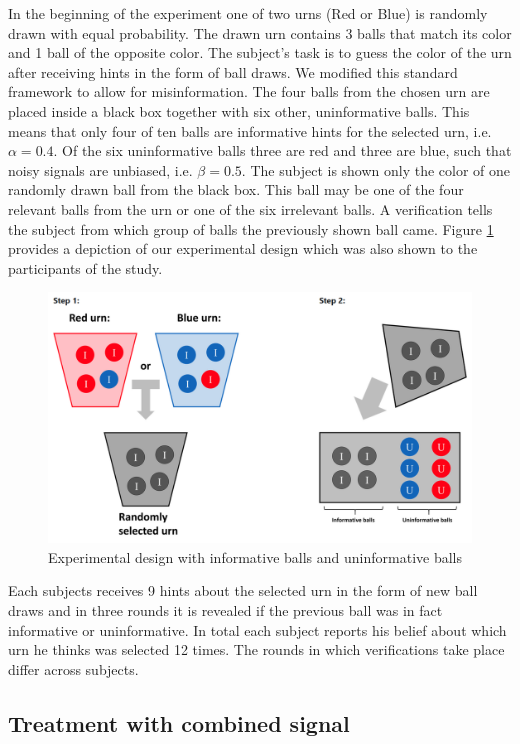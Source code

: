 \documentclass{article}
\begin{document}
In the beginning of the experiment one of two urns (Red or Blue) is randomly drawn with equal probability. The drawn urn contains 3 balls that match its color and 1 ball of the opposite color. The subject's task is to guess the color of the urn after receiving hints in the form of ball draws. We  modified this standard framework to allow for misinformation. The four balls from the chosen urn are placed inside a black box together with six other, uninformative balls. This means that only four of ten balls are informative hints for the selected urn, i.e. $\alpha=0.4$. Of the six uninformative balls three are red and three are blue, such that noisy signals are unbiased, i.e. $\beta=0.5$. The subject is shown only the color of one randomly drawn ball from the black box. This ball may be one of the four relevant balls from the urn or one of the six irrelevant balls. A verification tells the subject from which group of balls the previously shown ball came. Figure \ref{fig:instructions} provides a depiction of our experimental design which was also shown to the participants of the study.

\begin{figure}[!htb]
    \centering
    \includegraphics[width = 12cm]{Fig/instructions.png}
    \caption{Experimental design with informative balls and uninformative balls}
    \label{fig:instructions}
\end{figure}

Each subjects receives 9 hints about the selected urn in the form of new ball draws and in three rounds it is revealed if the previous ball was in fact informative or uninformative. In total each subject reports his belief about which urn he thinks was selected 12 times. The rounds in which verifications take place differ across subjects.

\subsection{Treatment with combined signal}
\end{document}
